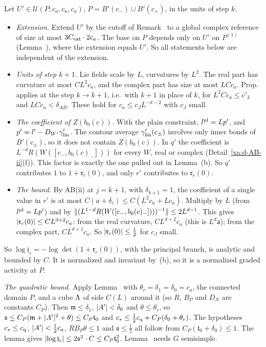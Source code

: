 \begin{detail}
\begin{step}
Let $U'\in\mathcal U(P;c_a,c_a,c_a)$, $P=B'(c_-)\cup B'(c_+)$, in the units of step $k$.
\begin{itemize}
\item \emph{Extension.} Extend $U'$ by the cutoff of Remark~ to a global complex reference of size at most $3C_{\rm ext}\cdot2c_a$. The base on $P$ depends only on $U'$ on $P^{(1)}$ (Lemma~), where the extension equals $U'$. So all statements below are independent of the extension.
\item \emph{Units of step $k+1$.} Lie fields scale by $L$, curvatures by $L^2$. The real part has curvature at most $CL^2c_a$, and the complex part has size at most $LCc_a$. Prop.~ applies at the step $k\to k+1$, i.e.\ with $k+1$ in place of $k$, for $L^2Cc_a\le c'_3$ and $LCc_a<\delta_{AB}$. These hold for $c_a\le c_JL^{-d-2}$ with $c_J$ small.
\item \emph{The coefficient of $Z(b_0(c))$.} With the plain constraint, $l^{\rm pl}=Lp'$, and $p'=l'-D_{W'}\gamma'_{\rm lin}$. The contour average $\gamma'_{\rm lin}(c_\pm)$ involves only inner bonds of $B'(c_\pm)$, so it does not contain $Z(b_0(c))$. In $q'$ the coefficient is $L^{-d}R(W([c_-,b_0(c)_-]))$ for every $W$, real or complex (Detail~\ref{xa:d-AB-ii}(f)). This factor is exactly the one pulled out in Lemma~(b). So $q'$ contributes $1$ to $1+\mathfrak r_c(0)$, and only $r'$ contributes to $\mathfrak r_c(0)$.
\item \emph{The bound.} By AB(ii) at $j=k+1$, with $\delta_{k+1}=1$, the coefficient of a single value in $r'$ is at most $C(a+\delta_c)\le C(L^2c_a+Lc_a)$. Multiply by $L$ (from $l^{\rm pl}=Lp'$) and by $\lVert(L^{1-d}R(W([c_-,b_0(c)_-])))^{-1}\rVert\le2L^{d-1}$. This gives $\lvert\mathfrak r_c(0)\rvert\le CL^{d+2}c_a$: from the real curvature, $CL^{d+2}c_a$ (this is $L^d\mathsf a$); from the complex part, $CL^{d+1}c_a$. So $\lvert\mathfrak r_c(0)\rvert\le\frac12$ for $c_J$ small.
\end{itemize}
So $\log\mathfrak j_c=-\log\det(1+\mathfrak r_c(0))$, with the principal branch, is analytic and bounded by $C$. It is normalized and invariant by~(b), so it is a normalized graded activity at $P$.

\emph{The quadratic bound.} Apply Lemma~ with $\theta_r=\delta_1=\delta_0=c_a$, the connected domain $P$, and a cube $\Lambda$ of side $C(L)$ around it (so $R$, $B_P$ and $D_N$ are constants $C_P$). Then $\mathfrak m\le\delta_1$, $\lvert A'\rvert<\delta_0$ and $\theta\le\theta_r$, so $\mathfrak s\le C_P(\mathfrak m+\lvert A'\rvert^2+\theta)\le C_P\mathfrak t_0$ and $c_*\le\frac12c_{\rm q}+C_P(\delta_0+\theta_r)$. The hypotheses $c_*\le c_{\rm q}$, $\lvert A'\rvert<\frac12c_a$, $RB_P\theta\le1$ and $\mathfrak s\le\frac12$ all follow from $C_P(\mathfrak t_0+\delta_0)\le1$. The lemma gives $\lvert\log\mathfrak j_c\rvert\le2\mathfrak s^2\cdot C\le C_P\mathfrak t_0^2$. Lemma~ needs $G$ semisimple.
\end{step}


\end{detail}

